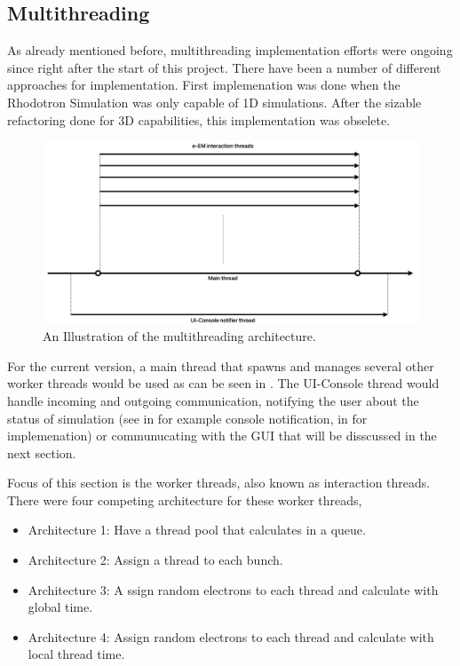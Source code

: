 \documentclass[a4paper,oneside,12pt]{report}
\numberwithin{equation}{chapter}
\begin{document}
{\subsection{Multithreading}
As already mentioned before, multithreading implementation efforts were ongoing since right after the start of this project. 
There have been a number of different approaches for implementation. 
First implemenation was done when the Rhodotron Simulation was only capable of 1D simulations.
After the sizable refactoring done for 3D capabilities, this implementation was obselete. 

\vspace{20pt}
\begin{figure}[H]
    \centering
    \includegraphics[width=\linewidth]{./figures/illustrations/multh_arc.png}
    \vspace{-20pt}
    \caption{An Illustration of the multithreading architecture.}
    \label{fig:multh_illustration}
\end{figure}

\clearpage
For the current version, a main thread that spawns and manages several other worker threads would be used as can be seen in .
The UI-Console thread would handle incoming and outgoing communication, notifying the user about the status of simulation 
(see  in  for example console notification,  in  for implemenation)
or communucating with the GUI that will be disscussed in the next section.

Focus of this section is the worker threads, also known as \eEM interaction threads.
There were four competing architecture for these worker threads,
\begin{itemize}
    \item Architecture 1: Have a thread pool that calculates \eEM in a queue. 
    \item Architecture 2: Assign a thread to each bunch.
    \item Architecture 3: A ssign random electrons to each thread and calculate \eEM with global time.
    \item Architecture 4: Assign random electrons to each thread and calculate \eEM with local thread time.
\end{itemize}

}
\end{document}
